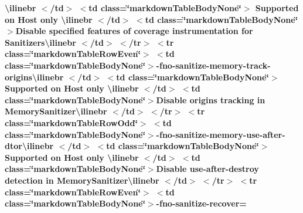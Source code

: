 \begin{longtabu}
{\bfseries{{\ttfamily \textbackslash{}ilinebr \texorpdfstring{$<$}{<}/td\texorpdfstring{$>$}{>} \texorpdfstring{$<$}{<}td class=\char`\"{}markdown\+Table\+Body\+None\char`\"{}\texorpdfstring{$>$}{>} Supported on Host only \textbackslash{}ilinebr \texorpdfstring{$<$}{<}/td\texorpdfstring{$>$}{>} \texorpdfstring{$<$}{<}td class=\char`\"{}markdown\+Table\+Body\+None\char`\"{}\texorpdfstring{$>$}{>}}Disable specified features of coverage instrumentation for Sanitizers{\ttfamily \textbackslash{}ilinebr \texorpdfstring{$<$}{<}/td\texorpdfstring{$>$}{>} \texorpdfstring{$<$}{<}/tr\texorpdfstring{$>$}{>} \texorpdfstring{$<$}{<}tr class=\char`\"{}markdown\+Table\+Row\+Even\char`\"{}\texorpdfstring{$>$}{>} \texorpdfstring{$<$}{<}td class=\char`\"{}markdown\+Table\+Body\+None\char`\"{}\texorpdfstring{$>$}{>}}-\/fno-\/sanitize-\/memory-\/track-\/origins{\ttfamily \textbackslash{}ilinebr \texorpdfstring{$<$}{<}/td\texorpdfstring{$>$}{>} \texorpdfstring{$<$}{<}td class=\char`\"{}markdown\+Table\+Body\+None\char`\"{}\texorpdfstring{$>$}{>} Supported on Host only \textbackslash{}ilinebr \texorpdfstring{$<$}{<}/td\texorpdfstring{$>$}{>} \texorpdfstring{$<$}{<}td class=\char`\"{}markdown\+Table\+Body\+None\char`\"{}\texorpdfstring{$>$}{>}}Disable origins tracking in Memory\+Sanitizer{\ttfamily \textbackslash{}ilinebr \texorpdfstring{$<$}{<}/td\texorpdfstring{$>$}{>} \texorpdfstring{$<$}{<}/tr\texorpdfstring{$>$}{>} \texorpdfstring{$<$}{<}tr class=\char`\"{}markdown\+Table\+Row\+Odd\char`\"{}\texorpdfstring{$>$}{>} \texorpdfstring{$<$}{<}td class=\char`\"{}markdown\+Table\+Body\+None\char`\"{}\texorpdfstring{$>$}{>}}-\/fno-\/sanitize-\/memory-\/use-\/after-\/dtor{\ttfamily \textbackslash{}ilinebr \texorpdfstring{$<$}{<}/td\texorpdfstring{$>$}{>} \texorpdfstring{$<$}{<}td class=\char`\"{}markdown\+Table\+Body\+None\char`\"{}\texorpdfstring{$>$}{>} Supported on Host only \textbackslash{}ilinebr \texorpdfstring{$<$}{<}/td\texorpdfstring{$>$}{>} \texorpdfstring{$<$}{<}td class=\char`\"{}markdown\+Table\+Body\+None\char`\"{}\texorpdfstring{$>$}{>}}Disable use-\/after-\/destroy detection in Memory\+Sanitizer{\ttfamily \textbackslash{}ilinebr \texorpdfstring{$<$}{<}/td\texorpdfstring{$>$}{>} \texorpdfstring{$<$}{<}/tr\texorpdfstring{$>$}{>} \texorpdfstring{$<$}{<}tr class=\char`\"{}markdown\+Table\+Row\+Even\char`\"{}\texorpdfstring{$>$}{>} \texorpdfstring{$<$}{<}td class=\char`\"{}markdown\+Table\+Body\+None\char`\"{}\texorpdfstring{$>$}{>}}-\/fno-\/sanitize-\/recover=}}


\end{longtabu}
